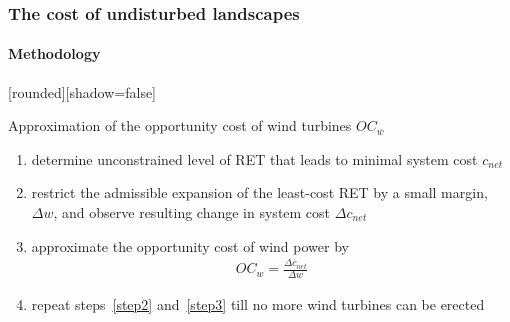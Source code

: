 \documentclass[aspectratio=1610, xcolor=dvipsnames]{beamer}
\begin{document}
    \begin{frame}
        \frametitle{The cost of undisturbed landscapes}
        \framesubtitle{Methodology}

        \medskip
        {%
            [rounded][shadow=false]
            \begin{block}{Approximation of the opportunity cost of wind turbines $OC_w$}
                \medskip
                \begin{enumerate}
                    \item determine unconstrained level of RET that leads to minimal system cost $c_{net}$ \label{step1}
                    \item restrict the admissible expansion of the least-cost RET by a small margin, $\Delta w$, and observe
                    resulting change in system cost $\Delta c_{net}$ \label{step2}
                    \item approximate the opportunity cost of wind power by \label{step3}
                    \begin{align*}
                        OC_w = \frac{\Delta c_{net}}{\Delta w}
                    \end{align*}
                    \item repeat steps~\ref{step2} and~\ref{step3} till no more wind turbines can be erected
                \end{enumerate}
            \end{block}
        }%
    \end{frame}
\end{document}
